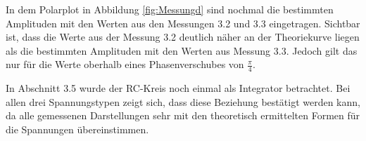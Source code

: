 In dem Polarplot in Abbildung \ref{fig:Messungd} sind nochmal die bestimmten Amplituden
mit den Werten aus den Messungen 3.2 und 3.3 eingetragen. Sichtbar ist, dass die
Werte aus der Messung 3.2 deutlich näher an der Theoriekurve liegen als die bestimmten
Amplituden mit den Werten aus Messung 3.3. Jedoch gilt das nur für die Werte
oberhalb eines Phasenverschubes von $\frac{\pi}{4}$.

In Abschnitt 3.5 wurde der RC-Kreis noch einmal als Integrator betrachtet. Bei allen
drei Spannungstypen zeigt sich, dass diese Beziehung bestätigt werden kann, da alle
gemessenen Darstellungen sehr mit den theoretisch ermittelten Formen für die
Spannungen übereinstimmen.


